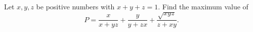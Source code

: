 Let $x,y,z$ be positive numbers with $x+y+z=1$. Find the maximum value of
\[
P=\dfrac{x}{x+yz}+\dfrac{y}{y+zx}+\dfrac{\sqrt{xyz}}{z+xy}.
\]
